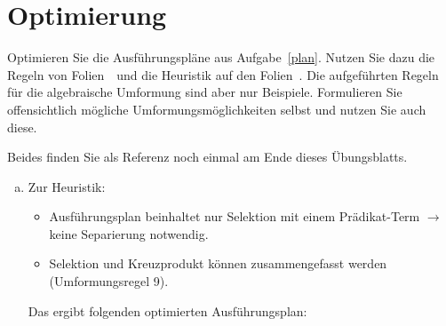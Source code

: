 \section{Optimierung}

Optimieren Sie die Ausführungspläne aus Aufgabe~\ref{plan}.
Nutzen Sie dazu die Regeln von Folien~\Operatorregel\ und die Heuristik auf den Folien~\Operatorheuristik.
Die aufgeführten Regeln für die algebraische Umformung sind aber nur Beispiele.
Formulieren Sie offensichtlich mögliche Umformungsmöglichkeiten selbst und nutzen Sie auch diese.

\begin{note}
Beides finden Sie als Referenz noch einmal am Ende dieses Übungsblatts.
\end{note}

\begin{solution}
\begin{enumerate}[a)]

\item Zur Heuristik:

\begin{itemize}
	\item Ausführungsplan beinhaltet nur Selektion mit einem Prädikat-Term $\rightarrow$ keine Separierung notwendig.
	\item Selektion und Kreuzprodukt können zusammengefasst werden (Umformungsregel 9).
\end{itemize}

Das ergibt folgenden optimierten Ausführungsplan:

\begin{center}
\end{center}


\end{enumerate}
\end{solution}
